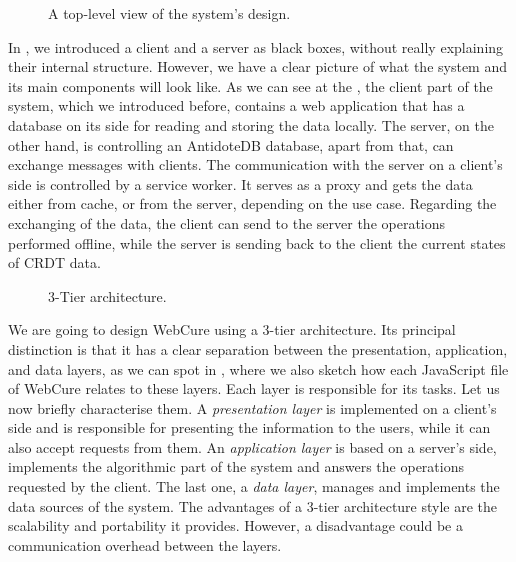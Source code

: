 \begin{figure}[!htb]
    \begin{center}
        \setlength{\fboxsep}{15pt}%
        \setlength{\fboxrule}{1pt}%
    \def\svgwidth{\linewidth}
    \fbox{}
    \caption {A top-level view of the system's design.}
    \label{fig:impl1}
\end{center}
\end{figure}

In , we introduced a client and a server as black boxes, without really explaining their internal structure. However, we have a clear picture of what the system and its main components will look like. As we can see at the , the client part of the system, which we introduced before, contains a web application that has a database on its side for reading and storing the data locally. The server, on the other hand, is controlling an AntidoteDB database, apart from that, can exchange messages with clients. The communication with the server on a client's side is controlled by a service worker. It serves as a proxy and gets the data either from cache, or from the server, depending on the use case. Regarding the exchanging of the data, the client can send to the server the operations performed offline, while the server is sending back to the client the current states of CRDT data. 

\begin{figure}[!htb]
    \begin{center}
    \def\svgwidth{\linewidth}
    
    \caption {3-Tier architecture.}
    \label{fig:dev1}
\end{center}
\end{figure}

We are going to design WebCure using a 3-tier architecture\cite{51}. Its principal distinction is that it has a clear separation between the presentation, application, and data layers, as we can spot in , where we also sketch how each JavaScript file of WebCure relates to these layers. Each layer is responsible for its tasks. Let us now briefly characterise them. A \textit{presentation layer} is implemented on a client's side and is responsible for presenting the information to the users, while it can also accept requests from them. An \textit{application layer} is based on a server's side, implements the algorithmic part of the system and answers the operations requested by the client. The last one, a \textit{data layer}, manages and implements the data sources of the system. The advantages of a 3-tier architecture style are the scalability and portability it provides. However, a disadvantage could be a communication overhead between the layers\cite{50}.

